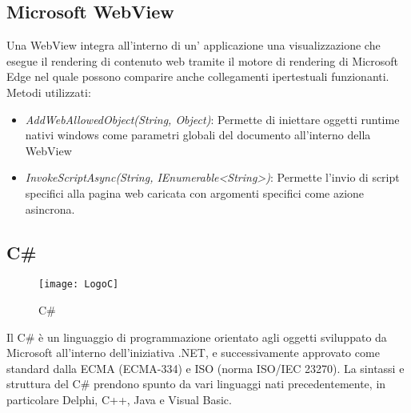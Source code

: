 \subsection{Microsoft WebView}
Una WebView integra all'interno di un' applicazione una visualizzazione che esegue il rendering di contenuto web tramite il motore di rendering di Microsoft Edge nel quale possono comparire anche collegamenti ipertestuali funzionanti.
Metodi utilizzati:
\begin{itemize}
\item \emph{AddWebAllowedObject(String, Object)}: Permette di iniettare oggetti runtime nativi windows come parametri globali del documento all'interno della WebView
\item \emph{InvokeScriptAsync(String, IEnumerable<String>)}: Permette l'invio di script specifici alla pagina web caricata con argomenti specifici come azione asincrona. 
\end{itemize}

\subsection{C\#}
\begin{figure}[htpb!]
\center
  \texttt{[image: LogoC]}
  \caption{C\#}
\end{figure}
Il C\# è un linguaggio di programmazione orientato agli oggetti sviluppato da Microsoft all'interno dell'iniziativa .NET, e successivamente approvato come standard dalla ECMA (ECMA-334) e ISO (norma ISO/IEC 23270).
La sintassi e struttura del C\# prendono spunto da vari linguaggi nati precedentemente, in particolare Delphi, C++, Java e Visual Basic.
